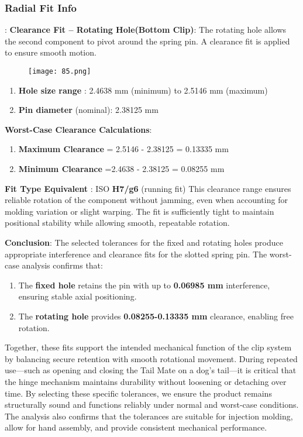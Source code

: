 \documentclass[12pt]{article}
\theoremstyle{definition} %
\theoremstyle{plain} %
\begin{document}
\subsubsection*{Radial Fit Info}:
\textbf{Clearance Fit – Rotating
Hole(Bottom Clip)}: The rotating hole allows the second
component to pivot around the spring
pin. A clearance fit is applied to ensure
smooth motion.
\begin{figure}[htbp]
  \centering
  \texttt{[image: 85.png]}
  \caption{}
  \label{fig:}
\end{figure}
\noindent
\begin{enumerate}
  \item \textbf{Hole size range} : 2.4638 mm (minimum) to 2.5146 mm (maximum)
  \item \textbf{Pin diameter}  (nominal): 2.38125 mm
\end{enumerate}

\textbf{Worst-Case Clearance Calculations}:
\vspace{.5cm} 
\noindent
\begin{enumerate}
  \item \textbf{Maximum Clearance}  = 2.5146 - 2.38125 = 0.13335 mm
  
 \item \textbf{Minimum Clearance}  =2.4638 - 2.38125 = 0.08255 mm
\end{enumerate} 
\textbf{Fit Type Equivalent} : ISO \textbf{H7/g6} (running fit)
This clearance range ensures reliable rotation of the component without jamming,
even when accounting for molding variation or slight warping. The fit is sufficiently
tight to maintain positional stability while allowing smooth, repeatable rotation.

\textbf{Conclusion}:
The selected tolerances for the fixed and rotating holes produce appropriate
interference and clearance fits for the slotted spring pin. The worst-case analysis
confirms that:
\noindent
\begin{enumerate}
  \item The \textbf{fixed hole} retains the pin with up to \textbf{0.06985 mm}  interference, ensuring
  stable axial positioning.
  \item 
  The \textbf{rotating hole}  provides \textbf{0.08255-0.13335 mm} clearance, enabling free
  rotation.
\end{enumerate}
Together, these fits support the intended mechanical function of the clip system by
balancing secure retention with smooth rotational movement. During repeated
use—such as opening and closing the Tail Mate on a dog's tail—it is critical that the
hinge mechanism maintains durability without loosening or detaching over time. By
selecting these specific tolerances, we ensure the product remains structurally sound
and functions reliably under normal and worst-case conditions. The analysis also
confirms that the tolerances are suitable for injection molding, allow for hand
assembly, and provide consistent mechanical performance.
\pagebreak
\end{document}
